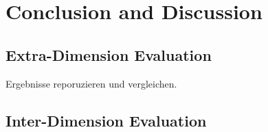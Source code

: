 \section{Conclusion and Discussion}
\subsection{Extra-Dimension Evaluation}
Ergebnisse reporuzieren und vergleichen.
\subsection{Inter-Dimension Evaluation}
